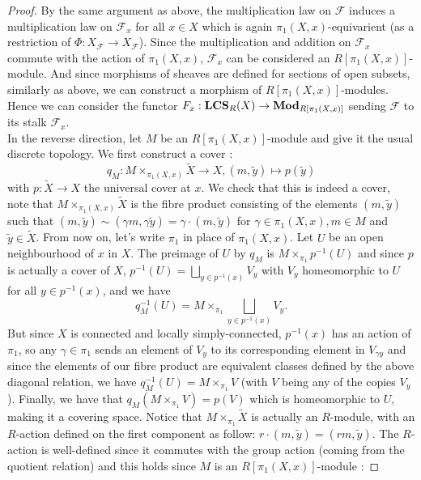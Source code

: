 \documentclass{article}
\theoremstyle{plain}
\theoremstyle{definition}
\DeclareMathOperator{\LCS}{\bf{LCS}}
\DeclareMathOperator{\Mod}{\bf{Mod}}
\begin{document}
\begin{proof}
    By the same argument as above, the multiplication law on $\mathcal{F}$ induces a multiplication law on $\mathcal{F}_x$ for all $x\in X$ which is again $\pi_1(X,x)$-equivarient (as a restriction of $\Phi : X_{\mathcal{F}}\rightarrow X_{\mathcal{F}}$).
    Since the multiplication and addition on $\mathcal{F}_x$ commute with the action of $\pi_1(X,x)$, $\mathcal{F}_x$ can be considered an $R[\pi_1(X,x)]$-module.
    And since morphisms of sheaves are defined for sections of open subsets, similarly as above, we can construct a morphism of $R[\pi_1(X,x)]$-modules. 
    Hence we can consider the functor $F_x:\LCS_R(X) \rightarrow \Mod_{R[\pi_1(X,x)]}$ sending $\mathcal{F}$ to its stalk $\mathcal{F}_x$.\\
    In the reverse direction, let $M$ be an $R[\pi_1(X,x)]$-module and give it the usual discrete topology.
    We first construct a cover : 
    $$q_M : M\times_{\pi_1(X,x)}\widetilde{X} \rightarrow X , (m,\widetilde{y})\mapsto p(\widetilde{y})$$ 
    with $p:\widetilde{X}\rightarrow X$ the universal cover at $x$.
    We check that this is indeed a cover,
    note that $M\times_{\pi_1(X,x)}\widetilde{X}$ is the fibre product consisting of the elements $(m,\widetilde{y})$ 
    such that 
    $(m , \widetilde{y}) \sim (\gamma m,\gamma\widetilde{y}) = \gamma\cdot (m,\widetilde{y})$ for $\gamma\in\pi_1(X,x), m\in M$ and $\widetilde{y}\in\widetilde{X}$.
    From now on, let's write $\pi_1$ in place of $\pi_1(X,x)$.
    Let $U$ be an open neighbourhood of $x$ in $X$. The preimage of $U$ by $q_M$ is $M\times_{\pi_1}p^{-1}(U)$ and since $p$ is actually a cover of $X$, $p^{-1}(U) = \bigsqcup_{y\in p^{-1}(x)} V_{y}$ with $V_{y}$ homeomorphic to $U$ for all $y\in p^{-1}(x)$, and we have 
    $$q_M^{-1}(U) =  M\times_{\pi_1}\bigsqcup_{y\in p^{-1}(x)}V_{y}.$$
    But since $X$ is connected and locally simply-connected, $p^{-1}(x)$ has an action of $\pi_1$, so any $\gamma\in\pi_1$ sends an element of $V_y$ to its corresponding element in $V_{\gamma y}$ and since the elements of our fibre product are equivalent classes defined by the above diagonal relation, we have 
    $q^{-1}_M(U) = M\times_{\pi_1}V$
    (with $V$ being any of the copies $V_{y}$).
    Finally, we have that $q_M(M\times_{\pi_1}V) = p(V)$ which is homeomorphic to $U$, making it a covering space.
    Notice that $M\times_{\pi_1}\widetilde{X}$ is actually an $R$-module, with an $R$-action defined on the first component as follow: $r\cdot(m,\widetilde{y}) = (rm,\widetilde{y})$. The $R$-action is well-defined since it commutes with the group action (coming from the quotient relation) and this holds since $M$ is an $R[\pi_1(X,x)]$-module :

\end{proof}
\end{document}
